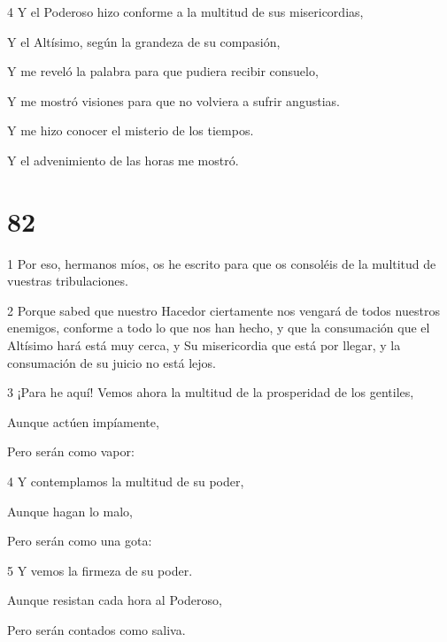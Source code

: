 \par 4 Y el Poderoso hizo conforme a la multitud de sus misericordias,

\par Y el Altísimo, según la grandeza de su compasión,

\par Y me reveló la palabra para que pudiera recibir consuelo,

\par Y me mostró visiones para que no volviera a sufrir angustias.

\par Y me hizo conocer el misterio de los tiempos.

\par Y el advenimiento de las horas me mostró.

\chapter{82}

\par 1 Por eso, hermanos míos, os he escrito para que os consoléis de la multitud de vuestras tribulaciones.

\par 2 Porque sabed que nuestro Hacedor ciertamente nos vengará de todos nuestros enemigos, conforme a todo lo que nos han hecho, y que la consumación que el Altísimo hará está muy cerca, y Su misericordia que está por llegar, y la consumación de su juicio no está lejos.

\par 3 ¡Para he aquí! Vemos ahora la multitud de la prosperidad de los gentiles,

\par Aunque actúen impíamente,

\par Pero serán como vapor:

\par 4 Y contemplamos la multitud de su poder,

\par Aunque hagan lo malo,

\par Pero serán como una gota:

\par 5 Y vemos la firmeza de su poder.

\par Aunque resistan cada hora al Poderoso,

\par Pero serán contados como saliva.

